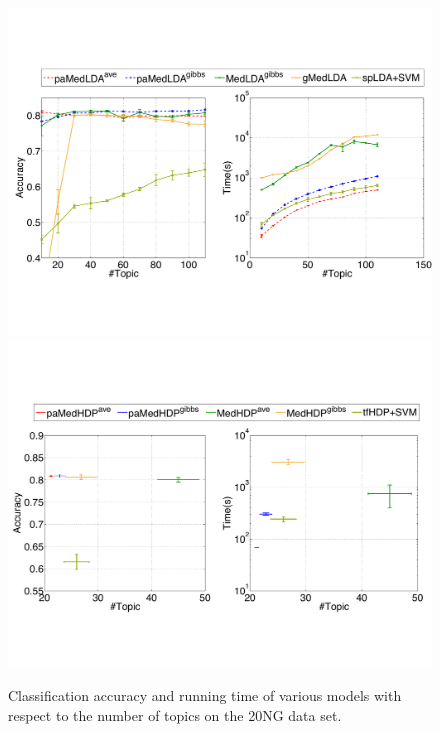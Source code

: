 \documentclass[twoside,11pt]{article}
\newcommand{\strin}[1]{\todo[size=\small, color=green!40]{\bf\sf  #1}}
\begin{document}
\begin{figure}[t]
\centering
\includegraphics[width = .95\textwidth]{plot_acc_topic_multic_lda.pdf}
\includegraphics[width = .95\textwidth]{plot_acc_topic_multic_hdp.pdf}\vspace*{-.2cm}
\caption{Classification accuracy and running time of various models with respect to the number of topics on the 20NG data set.}\vspace*{-0.3cm}
\label{fg:multic_topic_lda}
\end{figure}
\end{document}

